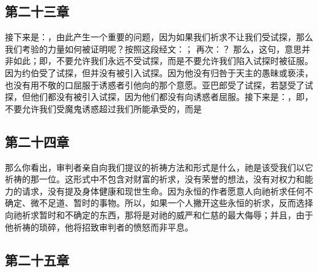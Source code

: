 
\subsection{第二十三章}

\par

接下来是：，由此产生一个重要的问题，因为如果我们祈求不让我们受试探，那么我们考验的力量如何被证明呢？按照这段经文：； 再次：？ 那么，这句，意思并非如此；即，不要允许我们永远不受试探，而是不要允许我们陷入试探时被征服。因为约伯受了试探，但并没有被引入试探。因为他没有归咎于天主的愚昧或亵渎，也没有用不敬的口屈服于诱惑者引他向的那个意愿。亚巴郎受了试探，若瑟受了试探，但他们都没有被引入试探，因为他们都没有向诱惑者屈服。接下来是：，即，不要允许我们受魔鬼诱惑超过我们所能承受的，而是\par


\subsection{第二十四章}

\par

那么你看出，审判者亲自向我们提议的祈祷方法和形式是什么，祂是该受我们以它祈祷的那一位。这形式中不包含对财富的祈求，没有荣誉的想法，没有对权力和能力的请求，没有提及身体健康和现世生命。因为永恒的作者愿意人向祂祈求任何不确定、微不足道、暂时的事物。所以，如果一个人撇开这些永恒的祈求，反而选择向祂祈求暂时和不确定的东西，那将是对祂的威严和仁慈的最大侮辱；并且，由于他祈祷的琐碎，他将招致审判者的愤怒而非平息。\par


\subsection{第二十五章}

